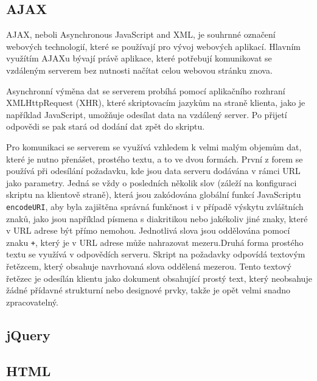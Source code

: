\documentclass[a4paper,11pt]{article}
\begin{document}
\subsection{AJAX}

AJAX, neboli Asynchronous JavaScript and XML, je souhrnné označení webových technologií, které se používají pro vývoj webových aplikací. Hlavním využítím AJAXu bývají právě aplikace, které potřebují komunikovat se vzdáleným serverem bez nutnosti načítat celou webovou stránku znova. 

Asynchronní výměna dat se serverem probíhá pomocí aplikačního rozhraní XMLHttpRequest (XHR), které skriptovacím jazykům na straně klienta, jako je například JavaScript, umožňuje odesílat data na vzdálený server. Po přijetí odpovědi se pak stará od dodání dat zpět do skriptu.

Pro komunikaci se serverem se využívá vzhledem k velmi malým objemům dat, které je nutno přenášet, prostého textu, a to ve dvou formách. První z forem se používá při odesílání požadavku, kde jsou data serveru dodávána v rámci URL jako parametry. Jedná se vždy o posledních několik slov (záleží na konfiguraci skriptu na klientově straně), která jsou zakódována globální funkcí JavaScriptu {\tt encodeURI}, aby byla zajištěna správná funkčnost i v případě výskytu zvláštních znaků, jako jsou například písmena s diakritikou nebo jakékoliv jiné znaky, které v URL adrese být přímo nemohou. Jednotlivá slova jsou oddělována pomocí znaku {\tt +}, který je v URL adrese může nahrazovat mezeru.Druhá forma prostého textu se využívá v odpovědích serveru. Skript na požadavky odpovídá textovým řetězcem, který obsahuje navrhovaná slova oddělená mezerou. Tento textový řetězec je odesílán klientu jako dokument obsahující prostý text, který neobsahuje žádné přídavné strukturní nebo designové prvky, takže je opět velmi snadno zpracovatelný.


\subsection{jQuery}


\subsection{HTML}
\end{document}
